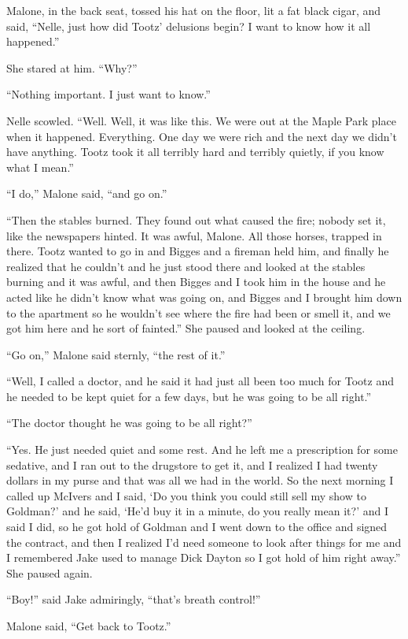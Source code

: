 \documentclass{novel}
\begin{document}
Malone, in the back seat, tossed his hat on the floor, lit a fat black cigar, and said, “Nelle, just how did Tootz’ delusions begin? I want to know how it all happened.”

She stared at him. “Why?”

“Nothing important. I just want to know.”

Nelle scowled. “Well. Well, it was like this. We were out at the Maple Park place when it happened. Everything. One day we were rich and the next day we didn’t have anything. Tootz took it all terribly hard and terribly quietly, if you know what I mean.”

“I do,” Malone said, “and go on.”

“Then the stables burned. They found out what caused the fire; nobody set it, like the newspapers hinted. It was awful, Malone. All those horses, trapped in there. Tootz wanted to go in and Bigges and a fireman held him, and finally he realized that he couldn’t and he just stood there and looked at the stables burning and it was awful, and then Bigges and I took him in the house and he acted like he didn’t know what was going on, and Bigges and I brought him down to the apartment so he wouldn’t see where the fire had been or smell it, and we got him here and he sort of fainted.” She paused and looked at the ceiling.

“Go on,” Malone said sternly, “the rest of it.”

“Well, I called a doctor, and he said it had just all been too much for Tootz and he needed to be kept quiet for a few days, but he was going to be all right.”

“The doctor thought he was going to be all right?”

“Yes. He just needed quiet and some rest. And he left me a prescription for some sedative, and I ran out to the drugstore to get it, and I realized I had twenty dollars in my purse and that was all we had in the world. So the next morning I called up McIvers and I said, ‘Do you think you could still sell my show to Goldman?’ and he said, ‘He’d buy it in a minute, do you really mean it?’ and I said I did, so he got hold of Goldman and I went down to the office and signed the contract, and then I realized I’d need someone to look after things for me and I remembered Jake used to manage Dick Dayton so I got hold of him right away.” She paused again.

“Boy!” said Jake admiringly, “that’s breath control!”

Malone said, “Get back to Tootz.”
\end{document}
